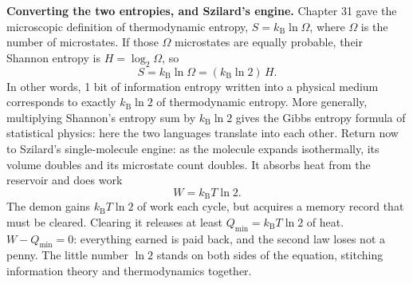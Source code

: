 \begin{mathbridge}
\textbf{Converting the two entropies, and Szilard's engine.} Chapter 31 gave the microscopic definition of thermodynamic entropy, $S=k_{\mathrm{B}}\ln\Omega$, where $\Omega$ is the number of microstates. If those $\Omega$ microstates are equally probable, their Shannon entropy is $H=\log_2\Omega$, so
\[
S=k_{\mathrm{B}}\ln\Omega=(k_{\mathrm{B}}\ln2)\,H.
\]
In other words, 1 bit of information entropy written into a physical medium corresponds to exactly $k_{\mathrm{B}}\ln2$ of thermodynamic entropy. More generally, multiplying Shannon's entropy sum by $k_{\mathrm{B}}\ln2$ gives the Gibbs entropy formula of statistical physics: here the two languages translate into each other. Return now to Szilard's single-molecule engine: as the molecule expands isothermally, its volume doubles and its microstate count doubles. It absorbs heat from the reservoir and does work
\[
W=k_{\mathrm{B}}T\ln 2 .
\]
The demon gains $k_{\mathrm{B}}T\ln2$ of work each cycle, but acquires a memory record that must be cleared. Clearing it releases at least $Q_{\min}=k_{\mathrm{B}}T\ln2$ of heat. $W-Q_{\min}=0$: everything earned is paid back, and the second law loses not a penny. The little number $\ln2$ stands on both sides of the equation, stitching information theory and thermodynamics together.
\end{mathbridge}

